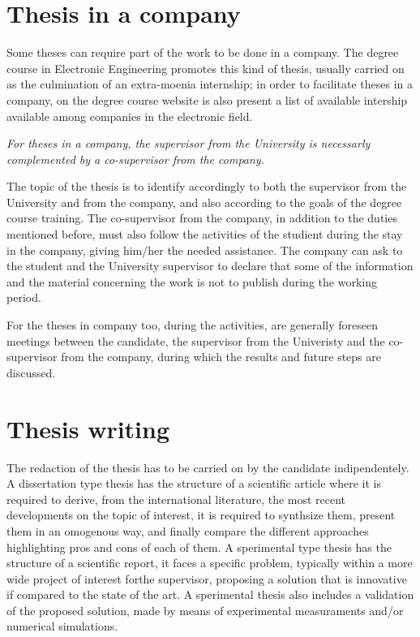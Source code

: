 \section{Thesis in a company}

Some theses can require part of the work to be done in a company. The degree course in Electronic Engineering promotes this kind of thesis, usually carried on as the culmination of an extra-moenia internship; in order to facilitate theses in a company, on the degree course website is also present a list of available intership available among companies in the electronic field.

\emph{For theses in a company, the supervisor from the University is necessarly complemented by a co-supervisor from the company.}

The topic of the thesis is to identify accordingly to both the supervisor from the University and from the company, and also according to the goals of the degree course training. The co-supervisor from the company, in addition to the duties mentioned before, must also follow the activities of the studient during the stay in the company, giving him/her the needed assistance. The company can ask to the student and the University supervisor to declare that some of the information and the material concerning the work is not to publish during the working period.

For the theses in company too, during the activities, are generally foreseen meetings between the candidate, the supervisor from the Univeristy and the co-supervisor from the company, during which the results and future steps are discussed.

\section{Thesis writing}

The redaction of the thesis has to be carried on by the candidate indipendentely. A dissertation type thesis has the structure of a scientific article where it is required to derive, from the international literature, the most recent developments on the topic of interest, it is required to synthsize them, present them in an omogenous way, and finally compare the different approaches highlighting pros and cons of each of them. A sperimental type thesis has the structure of a scientific report, it faces a specific problem, typically within a more wide project of interest forthe supervisor, proposing a solution that is innovative if compared to the state of the art. A sperimental thesis also includes a validation of the proposed solution, made by means of experimental measuraments and/or numerical simulations.

